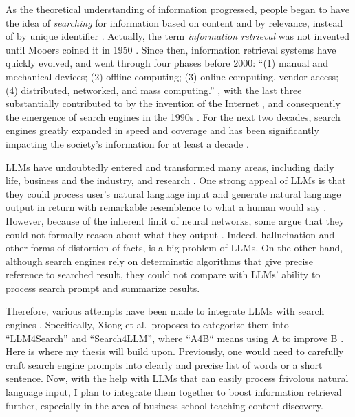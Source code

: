 \documentclass[project-plan]{report-template}
\begin{document}
As the theoretical understanding of information progressed, people began to
have the idea of \emph{searching} for information based on content
and by relevance, instead of by unique identifier
\cite{history.information.retrieval}. Actually, the term \emph{information
retrieval} was not invented until Mooers coined it in 1950
\cite{mooers.info.ret.term}. Since then, information retrieval systems have
quickly evolved, and went through four phases before 2000: ``(1) manual and mechanical
devices; (2) offline computing; (3) online computing, vendor access; (4)
distributed, networked, and mass computing.'' \cite{info.ret.4.phases}, with
the last three substantially contributed to by the invention of the Internet
\cite{history.internet}, and consequently the emergence of search engines in
the 1990s \cite{history.search.engines, history.internet.search.engines}.
For the next two decades, search engines greatly expanded in speed and
coverage and has been significantly impacting the society's information for at
least a decade \cite{search.engine.impact.1, search.engine.impact.2}.

LLMs have undoubtedly entered and transformed many areas, including daily life,
business and the industry, and research \cite{llm.impact.1}. One strong appeal
of LLMs is that they could process user's natural language input and generate
natural language output in return with remarkable resemblence to what a human
would say \cite{llm.power.1, llm.power.2}. However, because of the inherent
limit of neural networks, some argue that they could not formally reason about
what they output \cite{llm.limit.1, llm.limit.2, llm.limit.3}. Indeed, hallucination 
\cite{llm.hallucination.1, llm.hallucination.2} and other forms of distortion
of facts, is a big problem of LLMs. On the other hand, although search engines
rely on determinstic algorithms that give precise reference to searched result,
they could not compare with LLMs' ability to process search prompt and
summarize results. 

Therefore, various attempts have been made to integrate LLMs with search
engines \cite{llm.meet.search.1, llm.meet.search.2, llm.meet.search.3}.
Specifically, Xiong
et al.\ proposes to categorize them into ``LLM4Search'' and ``Search4LLM'',
where ``A4B`` means using A to improve B \cite{llm.meet.search.1}. Here is
where my thesis will build upon. Previously, one would need to carefully craft
search engine prompts into clearly and precise list of words or a short
sentence. Now, with the help with LLMs that can easily process frivolous
natural language input, I plan to integrate them together to boost information
retrieval further, especially in the area of business school teaching content
discovery.
\end{document}
